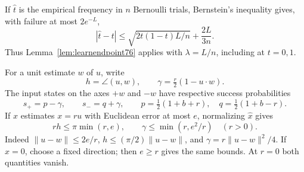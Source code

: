 If $\widehat t$ is the empirical frequency in $n$ Bernoulli trials,
Bernstein's inequality gives, with failure at most $2e^{-L}$,
\begin{equation}\label{eq:learnbernstein76}
 |\widehat t-t|
 \le\sqrt{2t(1-t)L/n}+\frac{2L}{3n}.
\end{equation}
Thus Lemma~\ref{lem:learnendpoint76} applies with
$\lambda=L/n$, including at $t=0,1$.

For a unit estimate $w$ of $u$, write
\begin{equation}\label{eq:learnmisalignment76}
 h=\angle(u,w),\qquad
 \gamma=\tfrac r2(1-u\cdot w).
\end{equation}
The input states on the axes $+w$ and $-w$ have respective success
probabilities
\begin{equation}\label{eq:learnaxisprob76}
 s_+=p-\gamma,\qquad s_-=q+\gamma,
 \qquad p=\tfrac12(1+b+r),\quad q=\tfrac12(1+b-r).
\end{equation}
If $\widehat x$ estimates $x=ru$ with Euclidean error at most $e$,
normalizing $\widehat x$ gives
\begin{equation}\label{eq:learnaxiserror76}
 rh\le\pi\min(r,e),\qquad
 \gamma\le\min(r,e^2/r)\quad(r>0).
\end{equation}
Indeed $\|u-w\|\le2e/r$, $h\le(\pi/2)\|u-w\|$, and
$\gamma=r\|u-w\|^2/4$.  If $\widehat x=0$, choose a fixed direction;
then $e\ge r$ gives the same bounds.  At $r=0$ both quantities vanish.

